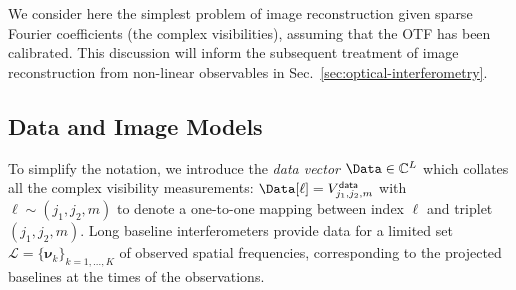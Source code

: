\documentclass{article}
\newcommand{\Tag}[1]{\mathsf{#1}}        %
\newcommand{\V}[1]{\boldsymbol{#1}}      %
\newcommand{\avg}[1]{\langle #1\rangle}
\newcommand{\Complexes}{\mathbb{C}}
\newcommand{\bydef}{\stackrel{\mathrm{def}}{=}}
\newcommand{\etc}{etc.\xspace}
\newcommand{\ComplexVis}{V}
\newcommand{\Freq}{\nu}               %
\newcommand{\VFreq}{\V{\Freq}}
\newcommand{\Posn}{r}                 %
\newcommand{\VPosn}{\V{\Posn}}
\newcommand{\FreqSet}{\mathcal{L}}  %
\newcommand{\BaseSet}{\mathcal{B}}  %
\newcommand{\ApertureList}{\mathcal{A}} %
\newcommand{\ExposureList}{\mathcal{E}} %
\newcommand{\DataTag}{\Tag{data}}
\begin{document}
We consider here the simplest problem of image reconstruction given sparse
Fourier coefficients (the complex visibilities), assuming that the OTF has
been calibrated. This discussion will inform the subsequent treatment of image
reconstruction from non-linear observables in
Sec.~\ref{sec:optical-interferometry}.


\subsection{Data and Image Models}
\label{sec:models}

To simplify the notation, we introduce the \emph{data vector}
$\Data\in\Complexes^L$ which collates all the complex visibility measurements:
$\Data[\ell]=\ComplexVis_{j_1,j_2,m}^\DataTag$ with $\ell\sim(j_1,j_2,m)$ to
denote a one-to-one mapping between index $\ell$ and triplet $(j_1,j_2,m)$.
Long baseline interferometers provide data for a limited set
$\FreqSet=\{\VFreq_k\}_{k=1,\ldots,K}$ of observed spatial frequencies,
corresponding to the projected baselines at the times of the observations.

\end{document}
